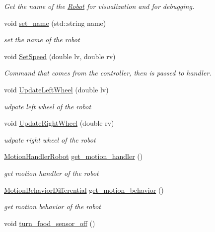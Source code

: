 \begin{DoxyCompactItemize}
\begin{DoxyCompactList}\small\item\em Get the name of the \hyperlink{classRobot}{Robot} for visualization and for debugging. \end{DoxyCompactList}\item 
void \hyperlink{classRobot_a21c93772c6bb44cd64e4b39f0678e5e6}{set\+\_\+name} (std\+::string name)
\begin{DoxyCompactList}\small\item\em set the name of the robot \end{DoxyCompactList}\item 
void \hyperlink{classRobot_ae73c71944d406aaf95b9a2d5117e13e9}{Set\+Speed} (double lv, double rv)\hypertarget{classRobot_ae73c71944d406aaf95b9a2d5117e13e9}{}\label{classRobot_ae73c71944d406aaf95b9a2d5117e13e9}

\begin{DoxyCompactList}\small\item\em Command that comes from the controller, then is passed to handler. \end{DoxyCompactList}\item 
void \hyperlink{classRobot_a8b0925698c75bffbeb57142b4a42ee48}{Update\+Left\+Wheel} (double lv)
\begin{DoxyCompactList}\small\item\em udpate left wheel of the robot \end{DoxyCompactList}\item 
void \hyperlink{classRobot_a11e66c923228136384c1ed10af851dd9}{Update\+Right\+Wheel} (double rv)
\begin{DoxyCompactList}\small\item\em udpate right wheel of the robot \end{DoxyCompactList}\item 
\hyperlink{classMotionHandlerRobot}{Motion\+Handler\+Robot} \hyperlink{classRobot_a77d37cf0058d18b7f633202e8c1bf814}{get\+\_\+motion\+\_\+handler} ()
\begin{DoxyCompactList}\small\item\em get motion handler of the robot \end{DoxyCompactList}\item 
\hyperlink{classMotionBehaviorDifferential}{Motion\+Behavior\+Differential} \hyperlink{classRobot_ab45bf3c6fdafcd14cdbdb2a8e3f558b8}{get\+\_\+motion\+\_\+behavior} ()
\begin{DoxyCompactList}\small\item\em get motion behavior of the robot \end{DoxyCompactList}\item 
void \hyperlink{classRobot_a8323cb087db1aa8012ac8a9cecb10bbe}{turn\+\_\+food\+\_\+sensor\+\_\+off} ()\hypertarget{classRobot_a8323cb087db1aa8012ac8a9cecb10bbe}{}\label{classRobot_a8323cb087db1aa8012ac8a9cecb10bbe}


\end{DoxyCompactItemize}

